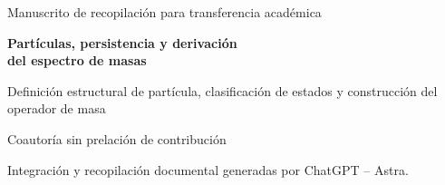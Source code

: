 \thispagestyle{empty}
\begin{center}
{\fontsize{8}{10}\selectfont Manuscrito de recopilación para transferencia académica\par}
\vspace{12mm}
{\fontsize{17}{20.5}\selectfont\bfseries Partículas, persistencia y derivación\\
del espectro de masas\par}
\vspace{6pt}
{\fontsize{11}{13.5}\selectfont Definición estructural de partícula, clasificación de estados y construcción del operador de masa\par}
\vspace{11pt}
{\fontsize{11.5}{14}\selectfont\Autores\par}
\vspace{4pt}
{\fontsize{8}{10}\selectfont Coautoría sin prelación de contribución\par}
\vspace{3pt}
{\fontsize{7.5}{9.5}\selectfont Integración y recopilación documental generadas por ChatGPT -- Astra.\par}
\end{center}
\vspace{7pt}
